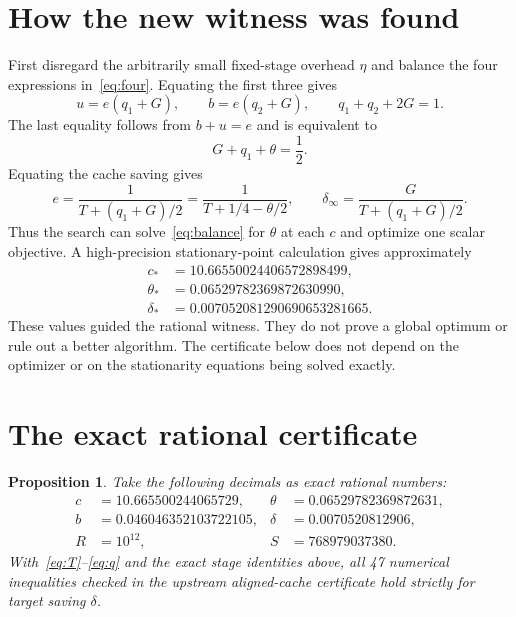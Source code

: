 \documentclass[11pt,a4paper]{article}
\newtheorem{proposition}{Proposition}
\begin{document}
\section{How the new witness was found}
First disregard the arbitrarily small fixed-stage overhead $\eta$ and
balance the four expressions in~\eqref{eq:four}. Equating the first
three gives
\[
 u=e(q_1+G),\qquad b=e(q_2+G),\qquad
 q_1+q_2+2G=1.
\]
The last equality follows from $b+u=e$ and is equivalent to
\begin{equation}
 G+q_1+\theta=\frac12.\label{eq:balance}
\end{equation}
Equating the cache saving gives
\[
 e=\frac1{T+(q_1+G)/2}
   =\frac1{T+1/4-\theta/2},\qquad
 \delta_\infty=\frac{G}{T+(q_1+G)/2}.
\]
Thus the search can solve~\eqref{eq:balance} for $\theta$ at each $c$
and optimize one scalar objective. A high-precision stationary-point
calculation gives approximately
\begin{align*}
 c_*&=10.66550024406572898499,\\
 \theta_*&=0.06529782369872630990,\\
 \delta_*&=0.007052081290690653281665.
\end{align*}
These values guided the rational witness. They do not prove a global
optimum or rule out a better algorithm. The certificate below does not
depend on the optimizer or on the stationarity equations being solved
exactly.

\section{The exact rational certificate}
\begin{proposition}
Take the following decimals as exact rational numbers:
\begin{align*}
 c&=10.665500244065729,&
 \theta&=0.06529782369872631,\\
 b&=0.046046352103722105,&
 \delta&=0.0070520812906,\\
 R&=10^{12},& S&=768979037380.
\end{align*}
With~\eqref{eq:T}--\eqref{eq:q} and the exact stage identities above,
all 47 numerical inequalities checked in the upstream aligned-cache
certificate hold strictly for target saving $\delta$.
\end{proposition}
\end{document}
